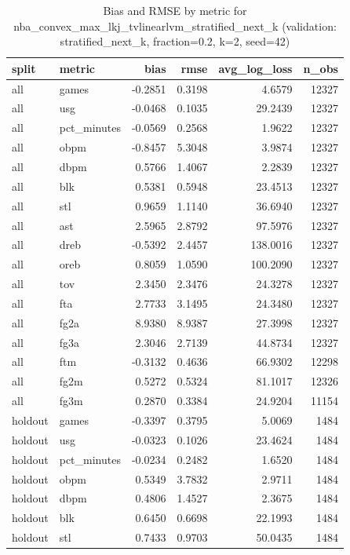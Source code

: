 \begin{table}
\caption{Bias and RMSE by metric for nba_convex_max_lkj_tvlinearlvm_stratified_next_k (validation: stratified_next_k, fraction=0.2, k=2, seed=42)}
\label{tab:nba_convex_max_lkj_tvlinearlvm_stratified_next_k_vs_stratified_next_k_f20_k2_s42_bias_rmse}
\begin{tabular}{llrrrr}
\toprule
split & metric & bias & rmse & avg\_log\_loss & n\_obs \\
\midrule
all & games & -0.2851 & 0.3198 & 4.6579 & 12327 \\
all & usg & -0.0468 & 0.1035 & 29.2439 & 12327 \\
all & pct\_minutes & -0.0569 & 0.2568 & 1.9622 & 12327 \\
all & obpm & -0.8457 & 5.3048 & 3.9874 & 12327 \\
all & dbpm & 0.5766 & 1.4067 & 2.2839 & 12327 \\
all & blk & 0.5381 & 0.5948 & 23.4513 & 12327 \\
all & stl & 0.9659 & 1.1140 & 36.6940 & 12327 \\
all & ast & 2.5965 & 2.8792 & 97.5976 & 12327 \\
all & dreb & -0.5392 & 2.4457 & 138.0016 & 12327 \\
all & oreb & 0.8059 & 1.0590 & 100.2090 & 12327 \\
all & tov & 2.3450 & 2.3476 & 24.3278 & 12327 \\
all & fta & 2.7733 & 3.1495 & 24.3480 & 12327 \\
all & fg2a & 8.9380 & 8.9387 & 27.3998 & 12327 \\
all & fg3a & 2.3046 & 2.7139 & 44.8734 & 12327 \\
all & ftm & -0.3132 & 0.4636 & 66.9302 & 12298 \\
all & fg2m & 0.5272 & 0.5324 & 81.1017 & 12326 \\
all & fg3m & 0.2870 & 0.3384 & 24.9204 & 11154 \\
holdout & games & -0.3397 & 0.3795 & 5.0069 & 1484 \\
holdout & usg & -0.0323 & 0.1026 & 23.4624 & 1484 \\
holdout & pct\_minutes & -0.0234 & 0.2482 & 1.6520 & 1484 \\
holdout & obpm & 0.5349 & 3.7832 & 2.9711 & 1484 \\
holdout & dbpm & 0.4806 & 1.4527 & 2.3675 & 1484 \\
holdout & blk & 0.6450 & 0.6698 & 22.1993 & 1484 \\
holdout & stl & 0.7433 & 0.9703 & 50.0435 & 1484 \\

\end{tabular}
\end{table}
